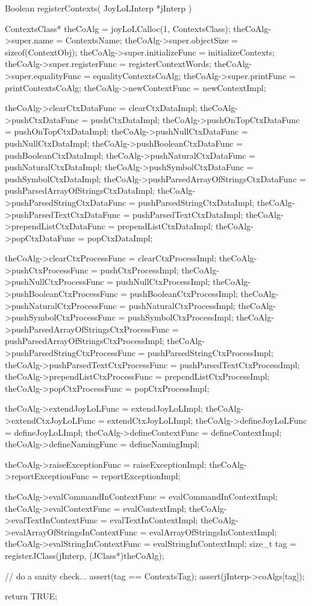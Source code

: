 \startCCode
Boolean registerContexts(
  JoyLoLInterp *jInterp
) {
  ContextsClass* theCoAlg    = 
    joyLoLCalloc(1, ContextsClass);
  theCoAlg->super.name             = ContextsName;
  theCoAlg->super.objectSize       = sizeof(ContextObj);
  theCoAlg->super.initializeFunc   = initializeContexts;
  theCoAlg->super.registerFunc     = registerContextWords;
  theCoAlg->super.equalityFunc     = equalityContextsCoAlg;
  theCoAlg->super.printFunc        = printContextsCoAlg;
  theCoAlg->newContextFunc         = newContextImpl;
  
  theCoAlg->clearCtxDataFunc       = clearCtxDataImpl;
  theCoAlg->pushCtxDataFunc        = pushCtxDataImpl;
  theCoAlg->pushOnTopCtxDataFunc   = pushOnTopCtxDataImpl;
  theCoAlg->pushNullCtxDataFunc    = pushNullCtxDataImpl;
  theCoAlg->pushBooleanCtxDataFunc = pushBooleanCtxDataImpl;
  theCoAlg->pushNaturalCtxDataFunc = pushNaturalCtxDataImpl;
  theCoAlg->pushSymbolCtxDataFunc  = pushSymbolCtxDataImpl;
  theCoAlg->pushParsedArrayOfStringsCtxDataFunc =
    pushParsedArrayOfStringsCtxDataImpl;
  theCoAlg->pushParsedStringCtxDataFunc =
    pushParsedStringCtxDataImpl;
  theCoAlg->pushParsedTextCtxDataFunc =
    pushParsedTextCtxDataImpl;
  theCoAlg->prependListCtxDataFunc = prependListCtxDataImpl;
  theCoAlg->popCtxDataFunc         = popCtxDataImpl;
  
  theCoAlg->clearCtxProcessFunc    = clearCtxProcessImpl;
  theCoAlg->pushCtxProcessFunc     = pushCtxProcessImpl;
  theCoAlg->pushNullCtxProcessFunc = pushNullCtxProcessImpl;
  theCoAlg->pushBooleanCtxProcessFunc =
    pushBooleanCtxProcessImpl;
  theCoAlg->pushNaturalCtxProcessFunc =
    pushNaturalCtxProcessImpl;
  theCoAlg->pushSymbolCtxProcessFunc =
    pushSymbolCtxProcessImpl;
  theCoAlg->pushParsedArrayOfStringsCtxProcessFunc =
    pushParsedArrayOfStringsCtxProcessImpl;
  theCoAlg->pushParsedStringCtxProcessFunc =
    pushParsedStringCtxProcessImpl;
  theCoAlg->pushParsedTextCtxProcessFunc =
    pushParsedTextCtxProcessImpl;
  theCoAlg->prependListCtxProcessFunc =
    prependListCtxProcessImpl;
  theCoAlg->popCtxProcessFunc      = popCtxProcessImpl;
  
  theCoAlg->extendJoyLoLFunc       = extendJoyLoLImpl;
  theCoAlg->extendCtxJoyLoLFunc    = extendCtxJoyLoLImpl;
  theCoAlg->defineJoyLoLFunc       = defineJoyLoLImpl;
  theCoAlg->defineContextFunc      = defineContextImpl;
  theCoAlg->defineNamingFunc       = defineNamingImpl;

  theCoAlg->raiseExceptionFunc     = raiseExceptionImpl;
  theCoAlg->reportExceptionFunc    = reportExceptionImpl;
  
  theCoAlg->evalCommandInContextFunc =
    evalCommandInContextImpl;
  theCoAlg->evalContextFunc        = evalContextImpl;
  theCoAlg->evalTextInContextFunc  = evalTextInContextImpl;
  theCoAlg->evalArrayOfStringsInContextFunc =
    evalArrayOfStringsInContextImpl;
  theCoAlg->evalStringInContextFunc =
    evalStringInContextImpl;
  size_t tag =
    registerJClass(jInterp, (JClass*)theCoAlg);

  // do a sanity check...
  assert(tag == ContextsTag);
  assert(jInterp->coAlgs[tag]);

  return TRUE;
}
\stopCCode

